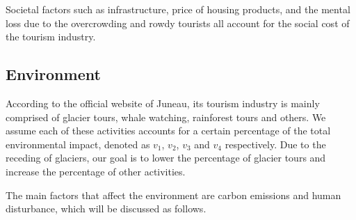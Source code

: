 Societal factors such as infrastructure, price of housing products, and the mental
loss due to the overcrowding and rowdy tourists all account for the social cost of the tourism industry.

\subsection{Environment}

According to the official website of Juneau, its tourism industry is 
mainly comprised of glacier tours, whale watching, rainforest tours and others.
We assume each of these activities accounts for a certain percentage of the total environmental impact,
denoted as $v_1$, $v_2$, $v_3$ and $v_4$ respectively. Due to the receding of glaciers,
our goal is to lower the percentage of glacier tours and increase the percentage of other activities.

The main factors that affect the environment are carbon emissions and human disturbance, which will be discussed as follows.
